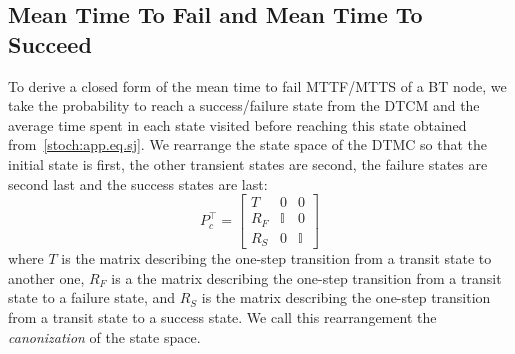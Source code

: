 
\subsection{Mean Time To Fail and Mean Time To Succeed}
To derive a closed form of the mean time to fail MTTF/MTTS of a BT node, we take the probability to reach a success/failure state from the DTCM and the average time spent in each state visited before reaching this state obtained from~\eqref{stoch:app.eq.sj}.
We rearrange the state space of the DTMC so that the initial state is first, the other transient states are second, the failure states are second last and the success states are last:
\begin{equation}
P_c^\top=\left[
\begin{array}{ccc}
T & {0}& {0} \\ 
R_F & \mathbb{I} & {0} \\
R_S & {0} & \mathbb{I} 
\end{array} \right]
\label{stoch:Example.eq.MTTSform}
\end{equation}
where $T$ is the matrix describing the one-step transition from a transit state to another one, $R_F$ is a the matrix describing the one-step transition from a transit state to a failure state, and $R_S$ is the matrix describing the one-step transition from a transit state to a success state. We call this rearrangement the \emph{canonization} of the state space. 


